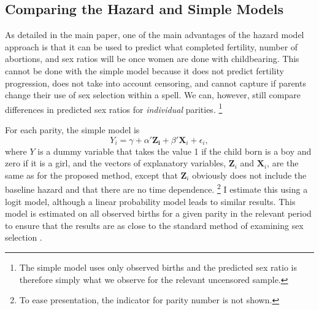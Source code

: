 \documentclass[12pt,letterpaper]{article}
\begin{document}
\subsection{Comparing the Hazard and Simple Models}

As detailed in the main paper, one of the main advantages of the hazard model 
approach is that it can be used to predict what completed fertility, number of abortions, 
and sex ratios will be once women are done with childbearing.
This cannot be done with the simple model because it does not predict fertility
progression, does not take into account censoring, and cannot capture if parents
change their use of sex selection within a spell.
We can, however, still compare differences in predicted sex ratios for 
\emph{individual} parities.%
\footnote{
The simple model uses only observed births and the predicted sex ratio is 
therefore simply what we observe for the relevant uncensored sample.
}

For each parity, the simple model is
\begin{equation}
Y_i = \gamma + \alpha' \mathbf{Z_i} + \beta' \mathbf{X}_{i} + \epsilon_i,
\end{equation}
where $Y$ is a dummy variable that takes the value 1 if the child born is a boy and zero 
if it is a girl, and the vectors of explanatory variables, $\mathbf{Z}_{i}$ and 
$\mathbf{X}_{i}$, are the same as for the proposed method, except that 
$\mathbf{Z}_{i}$ obviously does not include the baseline hazard and that there are 
no time dependence.%
\footnote{
To ease presentation, the indicator for parity number is not shown.
}
I estimate this using a logit model, although a linear probability model leads to
similar results.
This model is estimated on all observed births for a given parity in the relevant 
period to ensure that the results are as close to the standard method of 
examining sex selection \citep[see, for example, ][]{retherford03b,jha06,abrevaya09}.
\end{document}
